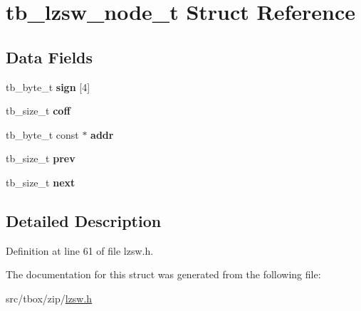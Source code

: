 \hypertarget{structtb__lzsw__node__t}{\section{tb\-\_\-lzsw\-\_\-node\-\_\-t Struct Reference}
\label{structtb__lzsw__node__t}
}
\subsection*{Data Fields}
\begin{DoxyCompactItemize}
\item 
\hypertarget{structtb__lzsw__node__t_ae30342a10d9c0728fa9614791a4386a1}{tb\-\_\-byte\-\_\-t {\bfseries sign} \mbox{[}4\mbox{]}}\label{structtb__lzsw__node__t_ae30342a10d9c0728fa9614791a4386a1}

\item 
\hypertarget{structtb__lzsw__node__t_a3ea02526365da326c1bf7e4cb1b7e76a}{tb\-\_\-size\-\_\-t {\bfseries coff}}\label{structtb__lzsw__node__t_a3ea02526365da326c1bf7e4cb1b7e76a}

\item 
\hypertarget{structtb__lzsw__node__t_a1f7e66a38e0bb35524dc604041555804}{tb\-\_\-byte\-\_\-t const $\ast$ {\bfseries addr}}\label{structtb__lzsw__node__t_a1f7e66a38e0bb35524dc604041555804}

\item 
\hypertarget{structtb__lzsw__node__t_a2a4fefbb30f3b99e11713588d84e13cd}{tb\-\_\-size\-\_\-t {\bfseries prev}}\label{structtb__lzsw__node__t_a2a4fefbb30f3b99e11713588d84e13cd}

\item 
\hypertarget{structtb__lzsw__node__t_a7d3ecb529e8e92d7a0abc63a69b5121f}{tb\-\_\-size\-\_\-t {\bfseries next}}\label{structtb__lzsw__node__t_a7d3ecb529e8e92d7a0abc63a69b5121f}

\end{DoxyCompactItemize}


\subsection{Detailed Description}


Definition at line 61 of file lzsw.\-h.



The documentation for this struct was generated from the following file\-:\begin{DoxyCompactItemize}
\item 
src/tbox/zip/\hyperlink{lzsw_8h}{lzsw.\-h}\end{DoxyCompactItemize}
